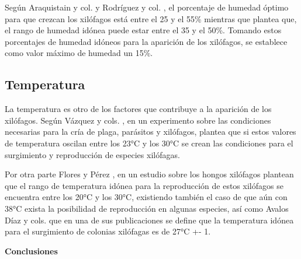     Según Araquistain y col. \cite{monitoringMoisture} y Rodríguez y col. \cite{rodriguezcodigo}, el porcentaje de humedad óptimo para que crezcan los xilófagos está entre el 25 y el 55\% mientras que \cite{woodPreservation} plantea que, el rango de humedad idónea puede estar entre el 35 y el 50\%. Tomando estos porcentajes de humedad idóneos para la aparición de los xilófagos, se establece como valor máximo de humedad un 15\%.

    \subsection{Temperatura}

    La temperatura es otro de los factores que contribuye a la aparición de los xilófagos. Según Vázquez y cols. \cite{vazquez1999avetianella}, en un experimento sobre las condiciones necesarias para la cría de plaga, parásitos y xilófagos, plantea que si estos valores de temperatura oscilan entre los 23°C y los 30°C se crean las condiciones para el surgimiento y reproducción de especies xilófagas. 

    Por otra parte Flores y Pérez \cite{floresDurabilidadNaturalDiez1987a}, en un estudio sobre los hongos xilófagos plantean que el rango de temperatura idónea para la reproducción de estos xilófagos se encuentra entre los 20°C y los 30°C, existiendo también el caso de que aún con 38°C exista la posibilidad de reproducción en algunas especies, así como Avalos Díaz y cols. \cite{avalosdiazInfluenciaDosHongos2020} que en una de sus publicaciones se define que la temperatura idónea para el surgimiento de colonias xilófagas es de 27°C +- 1.\\ 


    \textbf{\Large Conclusiones}\newline